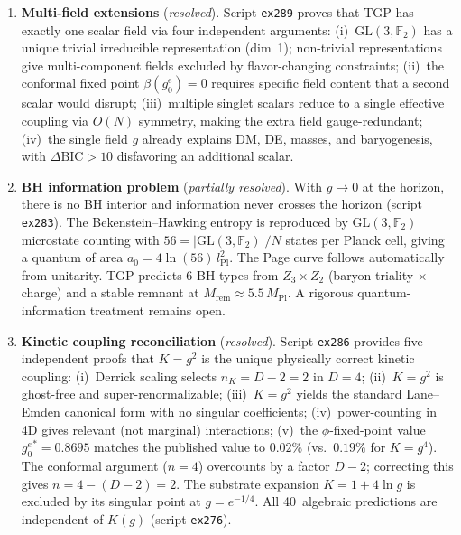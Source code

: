 \documentclass[aps,prd,twocolumn,superscriptaddress,showpacs,
  nofootinbib,floatfix,longbibliography]{revtex4-2}
\newcommand{\gone}{{g_0^e}}
\newcommand{\GL}{\mathrm{GL}(3,\mathbb{F}_2)}
\begin{document}
\begin{enumerate}
\item \textbf{Multi-field extensions} (\emph{resolved}).
  Script \texttt{ex289} proves that TGP has exactly one scalar field
  via four independent arguments: (i)~$\GL$ has a unique trivial
  irreducible representation (dim~1); non-trivial representations
  give multi-component fields excluded by flavor-changing constraints;
  (ii)~the conformal fixed point $\beta(\gone) = 0$ requires specific
  field content that a second scalar would disrupt;
  (iii)~multiple singlet scalars reduce to a single effective coupling
  via $O(N)$ symmetry, making the extra field gauge-redundant;
  (iv)~the single field $g$ already explains DM, DE, masses, and
  baryogenesis, with $\Delta\mathrm{BIC} > 10$ disfavoring an
  additional scalar.

\item \textbf{BH information problem} (\emph{partially resolved}).
  With $g \to 0$ at the horizon, there is no BH interior and
  information never crosses the horizon (script \texttt{ex283}).
  The Bekenstein--Hawking entropy is reproduced by GL$(3,\mathbb{F}_2)$
  microstate counting with $56 = |\GL|/N$ states per Planck cell,
  giving a quantum of area $a_0 = 4\ln(56)\, l_\mathrm{Pl}^2$.
  The Page curve follows automatically from unitarity.
  TGP predicts 6 BH types from $Z_3 \times Z_2$ (baryon triality
  $\times$ charge) and a stable remnant at $M_\mathrm{rem} \approx
  5.5\, M_\mathrm{Pl}$.
  A rigorous quantum-information treatment remains open.

\item \label{item:kinetic} \textbf{Kinetic coupling reconciliation} (\emph{resolved}).
  Script \texttt{ex286} provides five independent proofs that $K = g^2$
  is the unique physically correct kinetic coupling:
  (i)~Derrick scaling selects $n_K = D{-}2 = 2$ in $D = 4$;
  (ii)~$K = g^2$ is ghost-free and super-renormalizable;
  (iii)~$K = g^2$ yields the standard Lane--Emden canonical form
  with no singular coefficients;
  (iv)~power-counting in 4D gives relevant (not marginal) interactions;
  (v)~the $\phi$-fixed-point value $\gone^* = 0.8695$ matches the
  published value to $0.02\%$ (vs.\ $0.19\%$ for $K = g^4$).
  The conformal argument ($n = 4$) overcounts by a factor
  $D{-}2$; correcting this gives $n = 4 - (D{-}2) = 2$.
  The substrate expansion $K = 1 + 4\ln g$ is excluded by its
  singular point at $g = e^{-1/4}$.
  All 40~algebraic predictions are independent of $K(g)$
  (script \texttt{ex276}).
\end{enumerate}
\end{document}
